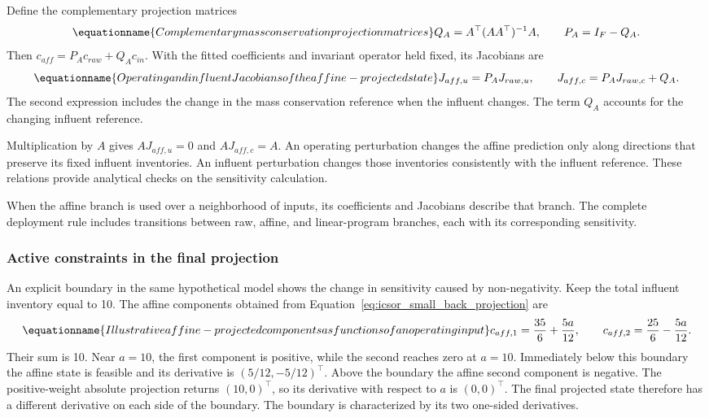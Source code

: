 Define the complementary projection matrices
\begin{equation}
\equationname{Complementary mass conservation projection matrices}
\label{eq:icsor_projection_matrices}
Q_A=A^\top(AA^\top)^{-1}A,
\qquad P_A=I_F-Q_A.
\end{equation}
Then \(c_{aff}=P_Ac_{raw}+Q_Ac_{in}\). With the fitted coefficients and invariant operator held fixed, its Jacobians are
\begin{equation}
\equationname{Operating and influent Jacobians of the affine-projected state}
\label{eq:icsor_affine_jacobians}
J_{aff,u}=P_AJ_{raw,u},
\qquad J_{aff,c}=P_AJ_{raw,c}+Q_A.
\end{equation}
The second expression includes the change in the mass conservation reference when the influent changes. The term \(Q_A\) accounts for the changing influent reference.

Multiplication by \(A\) gives \(AJ_{aff,u}=0\) and \(AJ_{aff,c}=A\). An operating perturbation changes the affine prediction only along directions that preserve its fixed influent inventories. An influent perturbation changes those inventories consistently with the influent reference. These relations provide analytical checks on the sensitivity calculation.

When the affine branch is used over a neighborhood of inputs, its coefficients and Jacobians describe that branch. The complete deployment rule includes transitions between raw, affine, and linear-program branches, each with its corresponding sensitivity.

\subsubsection{Active constraints in the final projection}

An explicit boundary in the same hypothetical model shows the change in sensitivity caused by non-negativity. Keep the total influent inventory equal to 10. The affine components obtained from Equation~\eqref{eq:icsor_small_back_projection} are
\begin{equation}
\equationname{Illustrative affine-projected components as functions of an operating input}
\label{eq:icsor_small_affine_branch}
c_{aff,1}=\frac{35}{6}+\frac{5a}{12},
\qquad
c_{aff,2}=\frac{25}{6}-\frac{5a}{12}.
\end{equation}
Their sum is 10. Near \(a=10\), the first component is positive, while the second reaches zero at \(a=10\). Immediately below this boundary the affine state is feasible and its derivative is \((5/12,-5/12)^\top\). Above the boundary the affine second component is negative. The positive-weight absolute projection returns \((10,0)^\top\), so its derivative with respect to \(a\) is \((0,0)^\top\). The final projected state therefore has a different derivative on each side of the boundary. The boundary is characterized by its two one-sided derivatives.


